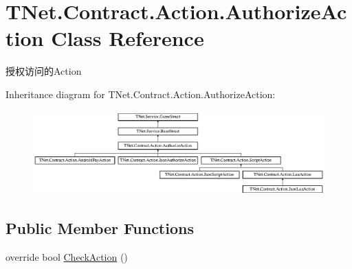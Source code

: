 \hypertarget{class_t_net_1_1_contract_1_1_action_1_1_authorize_action}{}\section{T\+Net.\+Contract.\+Action.\+Authorize\+Action Class Reference}
\label{class_t_net_1_1_contract_1_1_action_1_1_authorize_action}


授权访问的\+Action  


Inheritance diagram for T\+Net.\+Contract.\+Action.\+Authorize\+Action\+:\begin{figure}[H]
\begin{center}
\leavevmode
\includegraphics[height=3.243243cm]{class_t_net_1_1_contract_1_1_action_1_1_authorize_action}
\end{center}
\end{figure}
\subsection*{Public Member Functions}
\begin{DoxyCompactItemize}
\item 
override bool \mbox{\hyperlink{class_t_net_1_1_contract_1_1_action_1_1_authorize_action_ab0e2a7e8dacbac0da60cf5415ab5fcaf}{Check\+Action}} ()
\end{DoxyCompactItemize}
